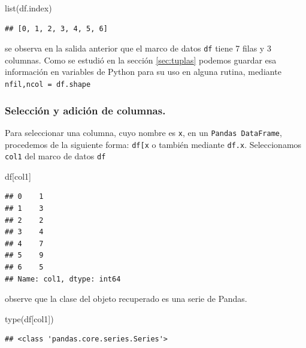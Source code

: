 \documentclass[
]{book}
\newenvironment{Shaded}{\begin{snugshade}}{\end{snugshade}}
\newcommand{\BuiltInTok}[1]{#1}
\newcommand{\NormalTok}[1]{#1}
\newcommand{\StringTok}[1]{\textcolor[rgb]{0.31,0.60,0.02}{#1}}
\theoremstyle{definition}
\theoremstyle{definition}
\theoremstyle{definition}
\theoremstyle{definition}
\theoremstyle{remark}
\begin{document}
\begin{Shaded}
\begin{Highlighting}[]
\BuiltInTok{list}\NormalTok{(df.index) }
\end{Highlighting}
\end{Shaded}

\begin{verbatim}
## [0, 1, 2, 3, 4, 5, 6]
\end{verbatim}

se observa en la salida anterior que el marco de datos \texttt{df} tiene 7 filas y 3 columnas. Como se estudió en la sección \ref{sec:tuplas} podemos guardar esa información en variables de Python para su uso en alguna rutina, mediante \texttt{nfil,ncol\ =\ df.shape}

\hypertarget{selecciuxf3n-y-adiciuxf3n-de-columnas.}{%
\subsubsection{Selección y adición de columnas.}\label{selecciuxf3n-y-adiciuxf3n-de-columnas.}}

Para seleccionar una columna, cuyo nombre es \texttt{x}, en un \texttt{Pandas\ DataFrame}, procedemos de la siguiente forma: \texttt{df{[}\textquotesingle{}x\textquotesingle{}{]}} o también mediante \texttt{df.x}. Seleccionamos \texttt{col1} del marco de datos \texttt{df}

\begin{Shaded}
\begin{Highlighting}[]
\NormalTok{df[}\StringTok{\textquotesingle{}col1\textquotesingle{}}\NormalTok{] }
\end{Highlighting}
\end{Shaded}

\begin{verbatim}
## 0    1
## 1    3
## 2    2
## 3    4
## 4    7
## 5    9
## 6    5
## Name: col1, dtype: int64
\end{verbatim}

observe que la clase del objeto recuperado es una serie de Pandas.

\begin{Shaded}
\begin{Highlighting}[]
\BuiltInTok{type}\NormalTok{(df[}\StringTok{\textquotesingle{}col1\textquotesingle{}}\NormalTok{])}
\end{Highlighting}
\end{Shaded}

\begin{verbatim}
## <class 'pandas.core.series.Series'>
\end{verbatim}
\end{document}
